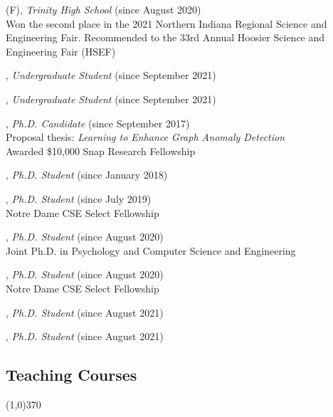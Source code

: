 \documentclass[10pt]{article}
\newenvironment{myindentpar}[1]%
{\begin{list}{}%
         {\setlength{\leftmargin}{#1}}%
         \item[]%
}
{\end{list}}
\newcounter{list}
\begin{document}
\begin{myindentpar}{0.75cm}

\hspace{-0.75cm}{\bf Rebekah Fang} (F), \textit{Trinity High School} (since August 2020) \\
	Won the second place in the 2021 Northern Indiana Regional Science and Engineering Fair. Recommended to the 33rd Annual Hoosier Science and Engineering Fair (HSEF)

\hspace{-0.75cm}{\bf Longqing Chen}, \textit{Undergraduate Student} (since September 2021)

\hspace{-0.75cm}{\bf Yunxiang (Ryan) Yan}, \textit{Undergraduate Student} (since September 2021)

\hspace{-0.75cm}{\bf Tong Zhao}, \textit{Ph.D. Candidate} (since September 2017) \\
	Proposal thesis: \textit{Learning to Enhance Graph Anomaly Detection} \\
	Awarded \$10,000 Snap Research Fellowship

\hspace{-0.75cm}{\bf Qingkai Zeng}, \textit{Ph.D. Student} (since January 2018)

\hspace{-0.75cm}{\bf Wenhao Yu}, \textit{Ph.D. Student} (since July 2019) \\
	Notre Dame CSE Select Fellowship

\hspace{-0.75cm}{\bf Lingbo Tong}, \textit{Ph.D. Student} (since August 2020) \\
	Joint Ph.D. in Psychology and Computer Science and Engineering

\hspace{-0.75cm}{\bf Mengxia Yu}, \textit{Ph.D. Student} (since August 2020) \\
	Notre Dame CSE Select Fellowship

\hspace{-0.75cm}{\bf Gang Liu}, \textit{Ph.D. Student} (since August 2021)

\hspace{-0.75cm}{\bf Zhihan Zhang}, \textit{Ph.D. Student} (since August 2021)

\end{myindentpar}

\subsection{\sc Teaching Courses}
\vspace{-0.4cm} \line(1,0){370} \vspace{-0.1cm}
\end{document}
